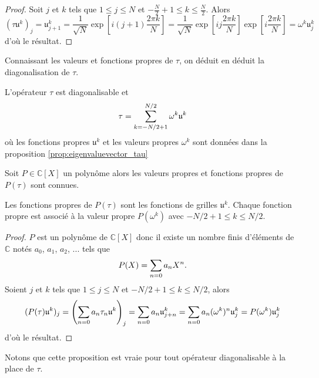 \begin{proof}
Soit $j$ et $k$ tels que $1 \leq j \leq N$ et $-\frac{N}{2}+1 \leq k \leq \frac{N}{2}$. Alors
\begin{equation}
(\tau \mathfrak{u}^k)_j = \mathfrak{u}^k_{j+1}  = \dfrac{1}{\sqrt{N}}\exp \left[ i (j+1) \dfrac{2 \pi k}{N} \right] = \dfrac{1}{\sqrt{N}} \exp \left[ i j \dfrac{2 \pi k}{N} \right] \exp \left[ i \dfrac{2 \pi k}{N} \right]  = \omega^k \mathfrak{u}_j^k
\end{equation}
d'où le résultat.
\end{proof}
Connaissant les valeurs et fonctions propres de $\tau$, on déduit en déduit la diagonalisation de $\tau$.

\begin{corollaire}
L'opérateur $\tau$ est diagonalisable et 
\begin{equation}
\tau = \displaystyle\sum\limits_{k = -N/2+1}^{N/2} \omega^k \mathfrak{u}^k
\end{equation}
où les fonctions propres $\mathfrak{u}^k$ et les valeurs propres $\omega^k$ sont données dans la proposition \ref{prop:eigenvaluevector_tau}
\end{corollaire}
Soit $P \in \mathbb{C}[X]$ un polynôme alors les valeurs propres et fonctions propres de $P(\tau)$ sont connues.

\begin{proposition}
Les fonctions propres de $P(\tau)$ sont les fonctions de grilles $\mathfrak{u}^k$.
Chaque fonction propre est associé à la valeur propre $P(\omega^k)$ avec $-N/2+1 \leq k \leq N/2$.
\label{prop:eigen_tau}
\end{proposition}

\begin{proof}
$P$ est un polynôme de $\mathbb{C}[X]$ donc il existe un nombre finis d'éléments de $\mathbb{C}$ notés $a_0$, $a_1$, $a_2$, ... tels que
\begin{equation}
P(X) = \displaystyle\sum\limits_{n=0} a_n X^n.
\end{equation}
Soient $j$ et $k$ tels que $1 \leq j \leq N$ et $-N/2+1 \leq k \leq N/2$, alors 
\begin{equation}
(P(\tau) \mathfrak{u}^k)_j = \left( \displaystyle\sum\limits_{n=0} a_n \tau_n \mathfrak{u}^k \right)_j = \displaystyle\sum\limits_{n=0} a_n \mathfrak{u}^k_{j+n}  = \displaystyle\sum\limits_{n=0} a_n (\omega^k)^n \mathfrak{u}^k_j = P(\omega^k) \mathfrak{u}^k_j
\end{equation}
d'où le résultat.
\end{proof}

Notons que cette proposition est vraie pour tout opérateur diagonalisable à la place de $\tau$.

